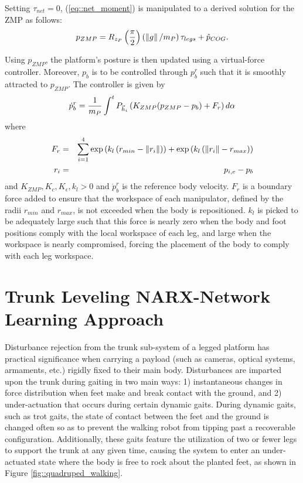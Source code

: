 		Setting $\tau_{net}=0$, (\ref{eq::net_moment}) is manipulated to a derived solution for the ZMP as follows:
			\begin{equation}
				{p}_{ZMP} = R_{z_P} \left(\frac{\pi}{2}\right)  \left( \left\lVert g\right\rVert/m_{P}\right) \tau_{legs} + \hat{p}_{COG}.
				\label{eq::ZMPFromMoment}
			\end{equation}

		Using ${p}_{ZMP}$, the platform's posture is then updated using a virtual-force controller. Moreover, ${p}_{b}$ is to be controlled through  ${p}_{b}^{r}$ such that it is smoothly attracted to ${p}_{ZMP}$. The controller is given by
			\begin{equation}
				\dot{p}_{b}^{r} 	= \frac{1}{m_{P}} \int^{t} {P}_{\vec{h}_{i}} \left(K_{ZMP}	( {p}_{ZMP} - {p}_{b} )  
				+ F_{r} \right) d\alpha
				\label{eq::ZMPController}
			\end{equation}	
		where
			\begin{eqnarray*}
				F_{r} 	& = &  \sum_{i=1}^{4} \exp \left(k_{l} \left(r_{min} -  \left\lVert r_{i}\right\rVert\right)\right) + \exp \left(k_{l} \left( \left\lVert r_{i}\right\rVert - r_{max}\right)\right) \nonumber \\
				r_{i}	& = & {p}_{i,e}- {p}_{b} \nonumber
			\end{eqnarray*}
		and $K_{ZMP}, K_{c}, K_{\epsilon}, k_{l} > 0$ and $\dot{p}_{b}^{r}$ is the reference body velocity. $F_{r}$ is a boundary force added to ensure that the workspace of each manipulator, defined by the radii $r_{min}$ and $r_{max}$, is not exceeded when the body is repositioned. $k_{l}$ is picked to be adequately large such that this force is nearly zero when the body and foot positions comply with the local workspace of each leg, and large when the workspace is nearly compromised, forcing the placement of the body to comply with each leg workspace.





	\section{Trunk Leveling NARX-Network Learning Approach}

		Disturbance rejection from the trunk sub-system of a legged platform has practical significance when carrying a payload (such as cameras, optical systems, armaments, etc.) rigidly fixed to their main body. Disturbances are imparted upon the trunk during gaiting in two main ways: 1) instantaneous changes in force distribution when feet make and break contact with the ground, and 2) under-actuation that occurs during certain dynamic gaits. During dynamic gaits, such as trot gaits, the state of contact between the feet and the ground is changed often so as to prevent the walking robot from tipping past a recoverable configuration. Additionally, these gaits feature the utilization of two or fewer legs to support the trunk at any given time, causing the 
		system to enter an under-actuated state where the body is free to rock about the planted feet, as shown in Figure \ref{fig::quadruped_walking}.

